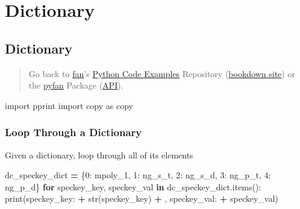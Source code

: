 \documentclass[
]{book}
\newenvironment{Shaded}{\begin{snugshade}}{\end{snugshade}}
\newcommand{\BuiltInTok}[1]{#1}
\newcommand{\ControlFlowTok}[1]{\textcolor[rgb]{0.13,0.29,0.53}{\textbf{#1}}}
\newcommand{\DecValTok}[1]{\textcolor[rgb]{0.00,0.00,0.81}{#1}}
\newcommand{\ImportTok}[1]{#1}
\newcommand{\KeywordTok}[1]{\textcolor[rgb]{0.13,0.29,0.53}{\textbf{#1}}}
\newcommand{\NormalTok}[1]{#1}
\newcommand{\OperatorTok}[1]{\textcolor[rgb]{0.81,0.36,0.00}{\textbf{#1}}}
\newcommand{\StringTok}[1]{\textcolor[rgb]{0.31,0.60,0.02}{#1}}
\begin{document}
\hypertarget{dictionary}{%
\section{Dictionary}\label{dictionary}}

\hypertarget{dictionary-1}{%
\subsection{Dictionary}\label{dictionary-1}}

\begin{quote}
Go back to \href{http://fanwangecon.github.io/}{fan}'s \href{https://fanwangecon.github.io/Py4Econ/}{Python Code Examples} Repository (\href{https://fanwangecon.github.io/Py4Econ/bookdown}{bookdown site}) or the \href{https://pyfan.readthedocs.io/en/latest/}{pyfan} Package (\href{https://pyfan.readthedocs.io/en/latest/reference.html}{API}).
\end{quote}

\begin{Shaded}
\begin{Highlighting}[]
\ImportTok{import}\NormalTok{ pprint}
\ImportTok{import}\NormalTok{ copy }\ImportTok{as}\NormalTok{ copy}
\end{Highlighting}
\end{Shaded}

\hypertarget{loop-through-a-dictionary}{%
\subsubsection{Loop Through a Dictionary}\label{loop-through-a-dictionary}}

Given a dictionary, loop through all of its elements

\begin{Shaded}
\begin{Highlighting}[]
\NormalTok{dc\_speckey\_dict }\OperatorTok{=}\NormalTok{ \{}\DecValTok{0}\NormalTok{: }\StringTok{\textquotesingle{}mpoly\_1\textquotesingle{}}\NormalTok{,}
                   \DecValTok{1}\NormalTok{: }\StringTok{\textquotesingle{}ng\_s\_t\textquotesingle{}}\NormalTok{,}
                   \DecValTok{2}\NormalTok{: }\StringTok{\textquotesingle{}ng\_s\_d\textquotesingle{}}\NormalTok{,}
                   \DecValTok{3}\NormalTok{: }\StringTok{\textquotesingle{}ng\_p\_t\textquotesingle{}}\NormalTok{,}
                   \DecValTok{4}\NormalTok{: }\StringTok{\textquotesingle{}ng\_p\_d\textquotesingle{}}\NormalTok{\}}
\ControlFlowTok{for}\NormalTok{ speckey\_key, speckey\_val }\KeywordTok{in}\NormalTok{ dc\_speckey\_dict.items():}
    \BuiltInTok{print}\NormalTok{(}\StringTok{\textquotesingle{}speckey\_key:\textquotesingle{}} \OperatorTok{+} \BuiltInTok{str}\NormalTok{(speckey\_key) }\OperatorTok{+} \StringTok{\textquotesingle{}, speckey\_val:\textquotesingle{}} \OperatorTok{+}\NormalTok{ speckey\_val)}
\end{Highlighting}
\end{Shaded}
\end{document}
